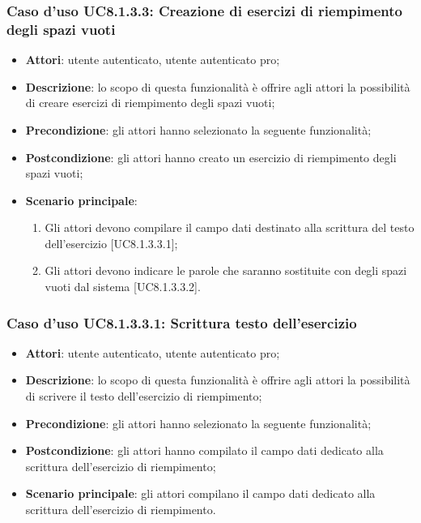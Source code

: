 \subsubsection{Caso d'uso UC8.1.3.3: Creazione di esercizi di riempimento degli spazi vuoti}
	\begin{itemize}
		\item
			\textbf{Attori}: utente autenticato, utente autenticato pro;
		\item		
			\textbf{Descrizione}: lo scopo di questa funzionalità è offrire agli attori la possibilità di creare esercizi di riempimento degli spazi vuoti;
		\item
			\textbf{Precondizione}: gli attori hanno selezionato la seguente funzionalità; 
		\item
			\textbf{Postcondizione}: gli attori hanno creato un esercizio di riempimento degli spazi vuoti;
		\item
			\textbf{Scenario principale}:
	       		\begin{enumerate}
	       			\item
	       			Gli attori devono compilare il campo dati destinato alla scrittura del testo dell'esercizio [UC8.1.3.3.1];
	       			\item
	       			Gli attori devono indicare le parole che saranno sostituite con degli spazi vuoti dal sistema [UC8.1.3.3.2].
	 			\end{enumerate}
	\end{itemize}
	
\subsubsection{Caso d'uso UC8.1.3.3.1: Scrittura testo dell'esercizio}
	\begin{itemize}
		\item
			\textbf{Attori}: utente autenticato, utente autenticato pro;
		\item		
			\textbf{Descrizione}: lo scopo di questa funzionalità è offrire agli attori la possibilità di scrivere il testo dell'esercizio di riempimento;
		\item
			\textbf{Precondizione}: gli attori hanno selezionato la seguente funzionalità; 
		\item
			\textbf{Postcondizione}: gli attori hanno compilato il campo dati dedicato alla scrittura dell'esercizio di riempimento;
		\item
			\textbf{Scenario principale}: gli attori compilano il campo dati dedicato alla scrittura dell'esercizio di riempimento.
	\end{itemize}


